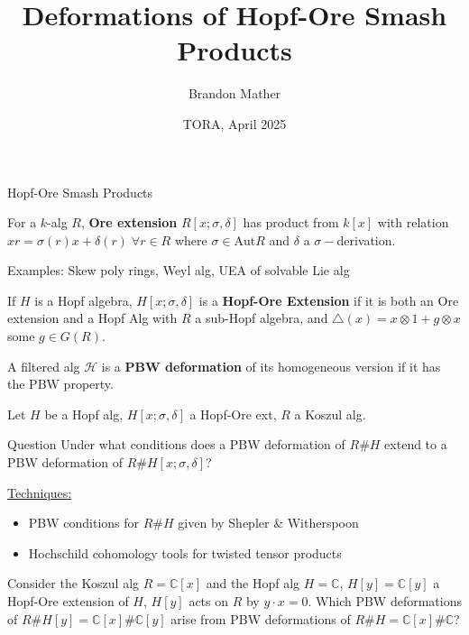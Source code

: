 \documentclass{beamer}
\title{Deformations of Hopf-Ore Smash Products}
\author{Brandon Mather}
\date{TORA, April 2025}
\begin{document}
\maketitle

\begin{frame}{Hopf-Ore Smash Products}
\begin{definition}
    For a \(k\)-alg \(R\), \textbf{Ore extension} \(R[x;\sigma,\delta]\) has product from \(k[x]\) with relation \(xr=\sigma(r)x+\delta(r)\;\forall r\in R\) where \(\sigma\in \text{Aut}R\) and \(\delta\) a \(\sigma-\)derivation. 
\end{definition}
Examples: Skew poly rings, Weyl alg, UEA of solvable Lie alg
\begin{definition}
    If \(H\) is a Hopf algebra, \(H[x;\sigma,\delta]\) is a \textbf{Hopf-Ore Extension} if it is both an Ore extension and a Hopf Alg with \(R\) a sub-Hopf algebra, and \(\triangle(x)=x\otimes 1+g\otimes x\) some \(g\in G(R)\).
\end{definition}
\begin{definition}
    A filtered alg \(\mathcal{H}\) is a \textbf{PBW deformation} of its homogeneous version if it has the PBW property.
\end{definition}
\end{frame}

\begin{frame} 
    Let \(H\) be a Hopf alg, \(H[x;\sigma,\delta]\) a Hopf-Ore ext, \(R\) a Koszul alg.
\begin{beamerboxesrounded}{Question}
    Under what conditions does a PBW deformation of \(R\#H\) extend to a PBW deformation of \(R\#H[x;\sigma,\delta]\)?
\end{beamerboxesrounded}

\underline{Techniques:}
\begin{itemize}
    \item PBW conditions for \(R\#H\) given by Shepler \& Witherspoon
    \item Hochschild cohomology tools for twisted tensor products
\end{itemize}
\begin{example}
    Consider the Koszul alg \(R=\mathbb{C}[x]\) and the Hopf alg \(H=\mathbb{C}\), \(H[y]=\mathbb{C}[y]\) a Hopf-Ore extension of \(H\), \(H[y]\) acts on \(R\) by \(y\cdot x=0\).
    Which PBW deformations of \(R\#H[y]=\mathbb{C}[x]\#\mathbb{C}[y]\) arise from PBW deformations of \(R\#H=\mathbb{C}[x]\#\mathbb{C}\)?
\end{example}
\end{frame}
\end{document}
